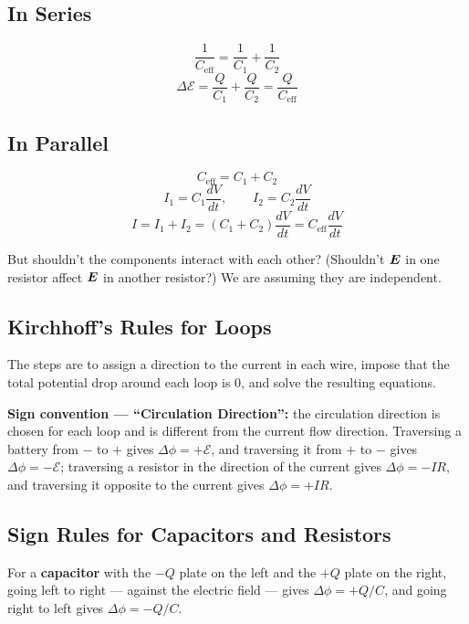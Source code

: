 \subsection{In Series}

\[
    \frac{1}{C_\text{eff}} = \frac{1}{C_1} + \frac{1}{C_2}
\]
\[
    \Delta\mathcal{E} = \frac{Q}{C_1} + \frac{Q}{C_2} = \frac{Q}{C_\text{eff}}
\]

\subsection{In Parallel}

\[
    C_\text{eff} = C_1 + C_2
\]
\[
    I_1 = C_1\frac{dV}{dt}, \qquad I_2 = C_2\frac{dV}{dt}
\]
\[
    I = I_1 + I_2 = (C_1+C_2)\frac{dV}{dt} = C_\text{eff}\frac{dV}{dt}
\]

\begin{fact}
But shouldn't the components interact with each other? (Shouldn't $\vect{E}$ in one resistor affect $\vect{E}$ in another resistor?) We are assuming they are independent.
\end{fact}

\subsection{Kirchhoff's Rules for Loops}

The steps are to assign a direction to the current in each wire, impose that the total potential drop around each loop is 0, and solve the resulting equations.

\textbf{Sign convention --- ``Circulation Direction'':} the circulation direction is chosen for each loop and is different from the current flow direction. Traversing a battery from $-$ to $+$ gives $\Delta\phi = +\mathcal{E}$, and traversing it from $+$ to $-$ gives $\Delta\phi = -\mathcal{E}$; traversing a resistor in the direction of the current gives $\Delta\phi = -IR$, and traversing it opposite to the current gives $\Delta\phi = +IR$.

\subsection{Sign Rules for Capacitors and Resistors}

For a \textbf{capacitor} with the $-Q$ plate on the left and the $+Q$ plate on the right, going left to right --- against the electric field --- gives $\Delta\phi = +Q/C$, and going right to left gives $\Delta\phi = -Q/C$.

